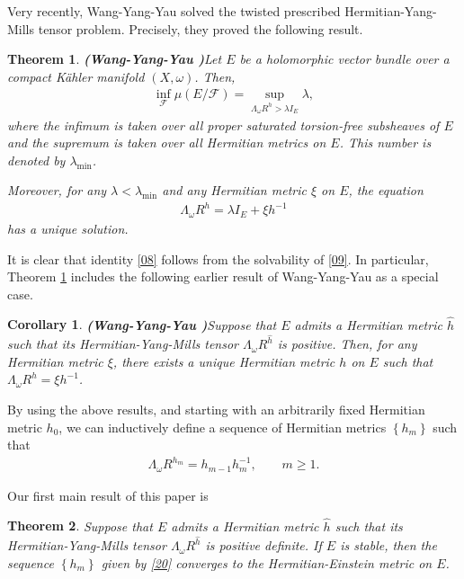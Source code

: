 \documentclass[11pt]{amsart}
\newtheorem{theorem}{Theorem}[section]
\newtheorem{corollary}{Corollary}[section]
\numberwithin{equation}{section}
\theoremstyle{remark}
\newcommand{\lb}{\left (}
\newcommand{\rb}{\right )}
\newcommand{\lfb}{\left \{}
\newcommand{\rfb}{\right \}}
\begin{document}
Very recently, Wang-Yang-Yau \cite{WYY3} solved the twisted prescribed Hermitian-Yang-Mills tensor problem. Precisely,  they proved the following result.

\begin{theorem}\textup{\bf (Wang-Yang-Yau \cite{WYY3})}\label{05}
Let $E$ be a holomorphic vector bundle over a compact K\"ahler manifold $(X,\omega)$. Then,
\begin{eqnarray}\label{08}
\inf_{\mathcal F}\mu\lb E/\mathcal F\rb=\sup_{\Lambda_\omega R^h>\lambda I_E}\lambda,
\end{eqnarray}
where the infimum is taken over all proper saturated torsion-free subsheaves of $E$ and the supremum is taken over all Hermitian metrics on $E$. This number is denoted by $\lambda_{\min}$.

Moreover,  for any $\lambda<\lambda_{\min}$ and any Hermitian metric $\xi$ on $E$, the equation
\begin{eqnarray}\label{09}
  \Lambda_\omega R^h=\lambda I_E+\xi h^{-1}
\end{eqnarray}
has a unique solution.
\end{theorem}

It is clear that identity \eqref{08} follows from the solvability of \eqref{09}. In particular,  Theorem \ref{05} includes the following earlier result of Wang-Yang-Yau \cite{WYY1} as a special case.

\begin{corollary} \textup{\bf (Wang-Yang-Yau \cite[Theorem 1.1] {WYY1})}\label{10}
 Suppose that $E$ admits a Hermitian metric $\hat{h}$ such that its Hermitian-Yang-Mills tensor $\Lambda_\omega R^{\hat h}$ is positive. Then, for any Hermitian metric $\xi$, there exists a unique Hermitian metric $h$ on $E$ such that $\Lambda_\omega R^h=\xi h^{-1}$.
\end{corollary}

By using the above results, and starting with an arbitrarily fixed Hermitian metric $h_0$, we can inductively define a sequence of Hermitian metrics $\lfb h_m\rfb$ such that
\begin{eqnarray}\label{20}
\Lambda_\omega R^{h_m}=h_{m-1}h_m^{-1}, \qquad m\geq 1.
\end{eqnarray}

Our first main result of this paper is
\begin{theorem}\label{main30}
Suppose that $E$ admits a Hermitian metric $\hat h$ such that its Hermitian-Yang-Mills tensor $\Lambda_\omega R^{\hat h}$ is positive definite.
If $E$ is stable, then the sequence $\lfb h_m\rfb$ given by \eqref{20} converges to the Hermitian-Einstein metric on $E$.
\end{theorem}
\end{document}
